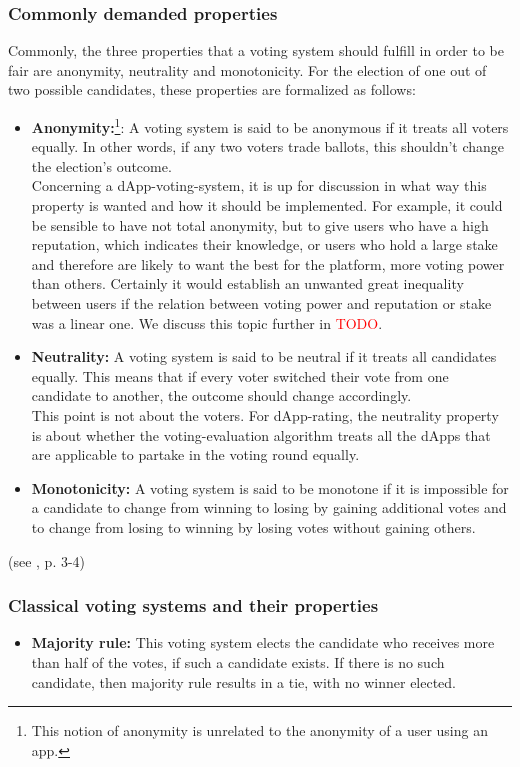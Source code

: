 \subsubsection{Commonly demanded properties}
Commonly, the three properties that a voting system should fulfill in order to be fair are anonymity, neutrality and monotonicity. For the election of one out of two possible candidates, these properties are formalized as follows:
\begin{itemize}
\item {\textbf{Anonymity:}\footnote{This notion of anonymity is unrelated to the anonymity of a user using an app.}}:	A voting system is said to be anonymous if it treats all voters equally. In other words, if any two voters trade ballots, this shouldn't change the election's outcome. \\
Concerning a dApp-voting-system, it is up for discussion in what way this property is wanted and how it should be implemented. For example, it could be sensible to have not total anonymity, but to give users who have a high reputation, which indicates their knowledge, or users who hold a large stake and therefore are likely to want the best for the platform, more voting power than others. Certainly it would establish an unwanted great inequality between users if the relation between voting power and reputation or stake was a linear one. We discuss this topic further in \textcolor{red}{TODO}. %
\item {\textbf{Neutrality:}} A voting system is said to be neutral if it treats all candidates equally. This means that if every voter switched their vote from one candidate to another, the outcome should change accordingly. \\
This point is not about the voters. For dApp-rating, the neutrality property is about whether the voting-evaluation algorithm treats all the dApps that are applicable to partake in the voting round equally. 

\item {\textbf{Monotonicity:}} A voting system is said to be monotone if it is impossible for a candidate to change from winning to losing by gaining additional votes and to change from losing to winning by losing votes without gaining others.
\end{itemize} 
(see \cite{voting}, p. 3-4)

\subsubsection{Classical voting systems and their properties}
\begin{itemize}[leftmargin = 0pt]
\item {\textbf{Majority rule:}} This voting system elects the candidate who receives more than half of the votes, if such a candidate exists. If there is no such candidate, then majority rule results in a tie, with no winner elected.
\end{itemize}


